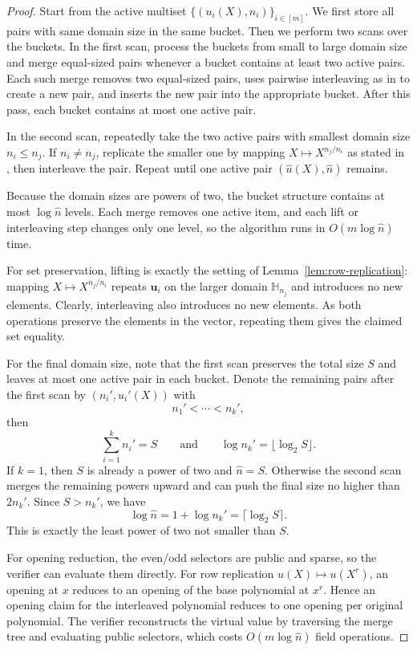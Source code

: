 \begin{proof}
Start from the active multiset $\{(u_i(X),n_i)\}_{i\in[m]}$.
We first store all pairs with same domain size in the same bucket.
Then we perform two scans over the buckets.
In the first scan, process the buckets from small to large domain size and
merge equal-sized pairs whenever a bucket contains at least two active pairs.
Each such merge removes two equal-sized pairs,
uses pairwise interleaving as in
 to create a new pair,
and inserts the new pair into the appropriate bucket. After this
pass, each bucket contains at most one active pair.

In the second scan, repeatedly take the two active pairs with smallest domain size $n_i \leq n_j$.
If $n_i\neq n_j$, replicate the smaller one by mapping $X\mapsto X^{n_j/n_i}$
as stated in ,
then interleave the pair.
Repeat until one active pair $(\widehat{u}(X),\widehat{n})$ remains.

Because the domain sizes are powers of two, the bucket structure contains at most
$\log \widehat{n}$ levels. Each merge removes one active item, and each lift
or interleaving step changes only one level, so the algorithm runs
in $O(m\log \widehat{n})$ time.

For set preservation, lifting is exactly the setting of
Lemma~\ref{lem:row-replication}:
mapping $X\mapsto X^{n_j/n_i}$ repeats
$\mathbf{u}_i$ on the larger domain $\mathbb{H}_{n_j}$ and introduces no new
elements. Clearly, interleaving also introduces no new elements.
As both operations preserve the elements in the vector, repeating them
gives the claimed set equality.

For the final domain size, note that the first scan preserves the total size $S$ and
leaves at most one active pair in each bucket. 
Denote the remaining pairs after the first scan by $(n_i', u_i'(X))$ with
\[
n_1'<\cdots<n_k',
\]
then
\[
\sum_{i=1}^k n_i' = S
\qquad\text{and}\qquad
\log n_k' = \lfloor \log_2 S\rfloor.
\]
If $k=1$, then $S$ is already a power of two and $\widehat{n}=S$. Otherwise
the second scan merges the remaining powers upward and can push the final size
no higher than $2n_k'$. Since $S>n_k'$, we have
\[
\log \widehat{n}= 1 + \log n_k' = \lceil \log_2 S\rceil.
\]
This is exactly the least power of two not smaller than $S$.

For opening reduction, the even/odd selectors are public and sparse, so the verifier can
evaluate them directly. For row replication $u(X)\mapsto u(X^r)$, an opening at
$x$ reduces to an opening of the base polynomial at $x^r$. Hence an opening
claim for the interleaved polynomial reduces to one opening per original
polynomial. The verifier reconstructs the virtual value by traversing the merge
tree and evaluating public selectors, which costs $O(m\log \widehat{n})$ field
operations.
\end{proof}

